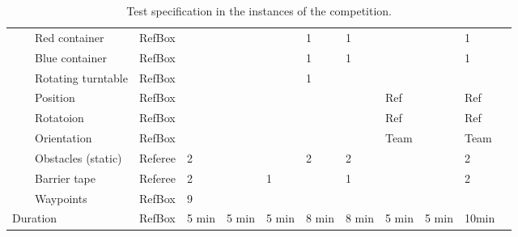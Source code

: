 \begin{landscape}
\begin{table}[h!]
\begin{tabular}{|l|l|l|l*{9}{|P{1cm}}|}
      &  & Red container       & RefBox &       &       &       &   1   &   1   &       &   & 1   \\ \hhline{~~----------}
      &  & Blue container      & RefBox &       &       &       &   1   &   1   &       &   & 1   \\ \hhline{~~----------}
      &  & Rotating turntable  & RefBox &       &       &       &   1   &      &       &   &    \\ 
      \hhline{------------} \hhline{------------}
      & 
         & Position     & RefBox &       &       &       &      &      &   Ref	  &   &  Ref   \\ \hhline{~~----------}
      &  & Rotatoion	& RefBox &       &       &       &      &      &   Ref    &   &  Ref   \\ \hhline{~~----------}
      &  & Orientation	& RefBox &       &       &       &      &      &   Team   &   &  Team  \\ 
    \hhline{~-----------} \hhline{~-----------}
     & 
     &     Obstacles (static) & Referee &  2    &       &       &   2   &   2   &       &   & 2   \\ \hhline{~~----------}
     &   & Barrier tape       & Referee &  2    &       &   1   &       &    1    &       &   & 2   \\ \hhline{~~----------}
     &   & Waypoints          & RefBox  &  9    &       &       &       &       &       &   &    \\ 
		\hline \hline
		 \multicolumn{3}{|l|}{Duration} 
		                    & RefBox & 5 min   & 5 min & 5 min  &   8 min &   8 min & 5 min & 5 min & 10min \\
		\hline
 \end{tabular}
 \caption{Test specification in the instances of the \RCAW \YEAR competition.}
 \label{tab:Instances}
\end{table}
\end{landscape}


